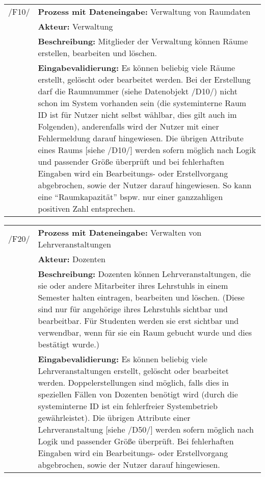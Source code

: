 \begin{tabular}{p{1.5cm}p{14.5cm}}
		
	 /F10/	& \textbf{Prozess mit Dateneingabe:} Verwaltung von Raumdaten \\
				& \textbf{Akteur:} Verwaltung \\
				& \textbf{Beschreibung:} Mitglieder der Verwaltung können Räume erstellen, bearbeiten und löschen. \\
				& \textbf{Eingabevalidierung:} Es können beliebig viele Räume erstellt, gelöscht oder bearbeitet werden. Bei der Erstellung darf die Raumnummer (siehe Datenobjekt /D10/) nicht schon im System vorhanden sein (die systeminterne Raum ID ist für Nutzer nicht selbst wählbar, dies gilt auch im Folgenden), anderenfalls wird der Nutzer mit einer Fehlermeldung darauf hingewiesen. Die übrigen Attribute eines Raums [siehe /D10/] werden sofern möglich nach Logik und passender Größe überprüft und bei fehlerhaften Eingaben wird ein Bearbeitungs- oder Erstellvorgang abgebrochen, sowie der Nutzer darauf hingewiesen. So kann eine "`Raumkapazität"' bspw. nur einer ganzzahligen positiven Zahl entsprechen. \\[0.25cm]

\end{tabular}


\begin{tabular}{p{1.5cm}p{14.5cm}}
		
	 /F20/	& \textbf{Prozess mit Dateneingabe:} Verwalten von Lehrveranstaltungen \\
				& \textbf{Akteur:} Dozenten \\
				& \textbf{Beschreibung:} Dozenten können Lehrveranstaltungen, die sie oder andere Mitarbeiter ihres Lehrstuhls in einem Semester halten eintragen, bearbeiten und löschen. (Diese sind nur für angehörige ihres Lehrstuhls sichtbar und bearbeitbar. Für Studenten werden sie erst sichtbar und verwendbar, wenn für sie ein Raum gebucht wurde und dies bestätigt wurde.) \\
				& \textbf{Eingabevalidierung:} Es können beliebig viele Lehrveranstaltungen erstellt, gelöscht oder bearbeitet werden. Doppelerstellungen sind möglich, falls dies in speziellen Fällen von Dozenten benötigt wird (durch die systeminterne ID ist ein fehlerfreier Systembetrieb gewährleistet). Die übrigen Attribute einer Lehrveranstaltung [siehe /D50/] werden sofern möglich nach Logik und passender Größe überprüft. Bei fehlerhaften Eingaben wird ein Bearbeitungs- oder Erstellvorgang abgebrochen, sowie der Nutzer darauf hingewiesen.\\[0.25cm]

\end{tabular}


